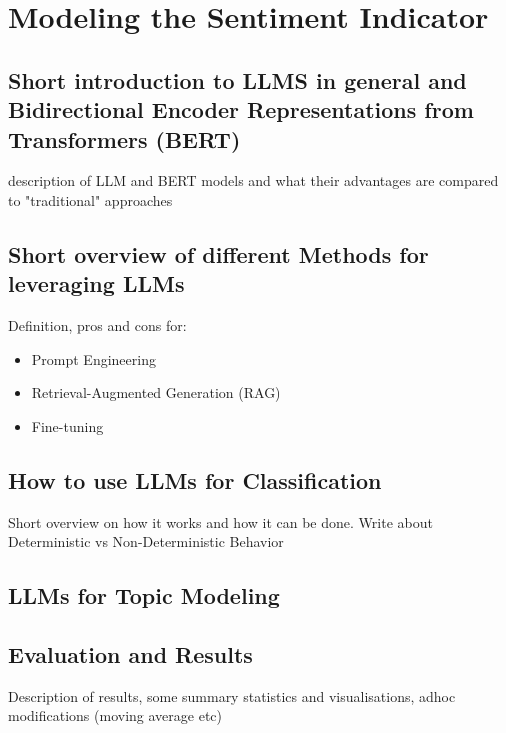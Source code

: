 \chapter{Modeling the Sentiment Indicator}\label{sec5}
\thispagestyle{empty}

\section{Short introduction to LLMS in general and Bidirectional Encoder Representations from Transformers (BERT)}

description of LLM and BERT models and what their advantages are compared to "traditional" approaches

\section{Short overview of different Methods for leveraging LLMs}

Definition, pros and cons for:

\begin{itemize}
	\item Prompt Engineering
	\item Retrieval-Augmented Generation (RAG)
	\item Fine-tuning
\end{itemize}

\section{How to use LLMs for Classification}

Short overview on how it works and how it can be done. Write about Deterministic vs Non-Deterministic Behavior

\section{LLMs for Topic Modeling}

\section{Evaluation and Results}

Description of results, some summary statistics and visualisations, adhoc modifications (moving average etc)

%







\cleardoublepage
